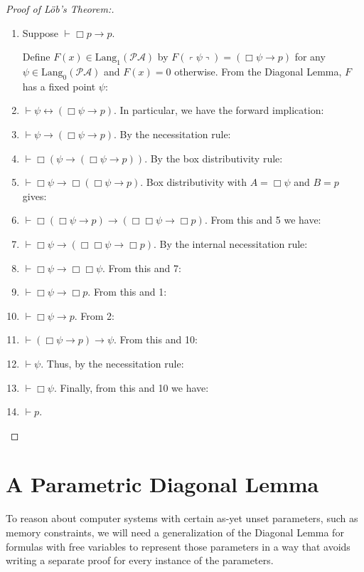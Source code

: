 \documentclass[onecolumn]{miri-tech-article}
\numberwithin{equation}{section}
\theoremstyle{definition}
\newcommand{\PA}{\mathcal{P}\!\mathcal{A}}
\newcommand{\Lang}{\mathrm{Lang}}
\newcommand{\qquote}[1]{\left\ulcorner #1 \right\urcorner}
\renewcommand{\-}{^{-1}}
\begin{document}
\begin{proof}[Proof of L\"{o}b's Theorem:]\ 

\begin{enumerate}
\item Suppose $\vdash \Box p \rightarrow p$.

Define $F(x) \in \Lang_1(\PA)$ by $F(\qquote\psi) = (\Box \psi \rightarrow p)$ for any $\psi \in \Lang_0(\PA)$ and $F(x) = 0$ otherwise.  From the Diagonal Lemma, $F$ has a fixed point $\psi$:

\item $\vdash \psi \leftrightarrow (\Box \psi \rightarrow p)$.  In particular, we have the forward implication:
\item $\vdash \psi \rightarrow (\Box \psi \rightarrow p)$.  By the necessitation rule:
\item $\vdash \Box(\psi \rightarrow (\Box \psi \rightarrow p))$.  By the box distributivity rule:
\item $\vdash \Box\psi \rightarrow \Box(\Box \psi \rightarrow p)$.  Box distributivity with $ A = \Box \psi $ and $ B= p$ gives:
\item $\vdash \Box(\Box \psi \rightarrow p) \rightarrow (\Box\Box\psi \rightarrow \Box p)$.  From this and 5 we have:
\item $\vdash \Box \psi \rightarrow (\Box\Box\psi \rightarrow \Box p)$.  By the internal necessitation rule:
\item $\vdash \Box \psi \rightarrow \Box \Box \psi$.  From this and 7:
\item $\vdash \Box \psi \rightarrow \Box p$.  From this and 1:
\item $\vdash \Box \psi \rightarrow p$.  From 2:
\item $\vdash (\Box \psi \rightarrow p) \rightarrow \psi$.  From this and 10:
\item $\vdash \psi$.  Thus, by the necessitation rule:
\item $\vdash \Box \psi$.  Finally, from this and 10 we have:
\item $\vdash p$.
\end{enumerate}

\end{proof}

\section{A Parametric Diagonal Lemma}
To reason about computer systems with certain as-yet unset parameters, such as memory constraints, we will need a generalization of the Diagonal Lemma for formulas with free variables to represent those parameters in a way that avoids writing a separate proof for every instance of the parameters.
\end{document}
